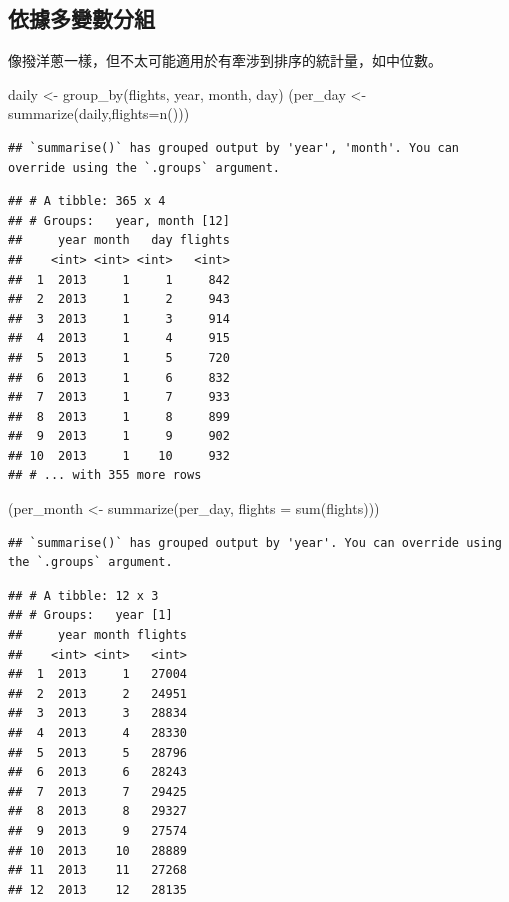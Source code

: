 \documentclass[
]{book}
\newenvironment{Shaded}{\begin{snugshade}}{\end{snugshade}}
\newcommand{\AttributeTok}[1]{\textcolor[rgb]{0.77,0.63,0.00}{#1}}
\newcommand{\FunctionTok}[1]{\textcolor[rgb]{0.00,0.00,0.00}{#1}}
\newcommand{\NormalTok}[1]{#1}
\newcommand{\OtherTok}[1]{\textcolor[rgb]{0.56,0.35,0.01}{#1}}
\theoremstyle{definition}
\theoremstyle{remark}
\begin{document}
\hypertarget{ux4f9dux64daux591aux8b8aux6578ux5206ux7d44}{%
\subsection{依據多變數分組}\label{ux4f9dux64daux591aux8b8aux6578ux5206ux7d44}}

像撥洋蔥一樣，但不太可能適用於有牽涉到排序的統計量，如中位數。

\begin{Shaded}
\begin{Highlighting}[]
\NormalTok{daily }\OtherTok{\textless{}{-}} \FunctionTok{group\_by}\NormalTok{(flights, year, month, day)}
\NormalTok{(per\_day }\OtherTok{\textless{}{-}}\FunctionTok{summarize}\NormalTok{(daily,}\AttributeTok{flights=}\FunctionTok{n}\NormalTok{()))}
\end{Highlighting}
\end{Shaded}

\begin{verbatim}
## `summarise()` has grouped output by 'year', 'month'. You can override using the `.groups` argument.
\end{verbatim}

\begin{verbatim}
## # A tibble: 365 x 4
## # Groups:   year, month [12]
##     year month   day flights
##    <int> <int> <int>   <int>
##  1  2013     1     1     842
##  2  2013     1     2     943
##  3  2013     1     3     914
##  4  2013     1     4     915
##  5  2013     1     5     720
##  6  2013     1     6     832
##  7  2013     1     7     933
##  8  2013     1     8     899
##  9  2013     1     9     902
## 10  2013     1    10     932
## # ... with 355 more rows
\end{verbatim}

\begin{Shaded}
\begin{Highlighting}[]
\NormalTok{(per\_month }\OtherTok{\textless{}{-}} \FunctionTok{summarize}\NormalTok{(per\_day, }\AttributeTok{flights =} \FunctionTok{sum}\NormalTok{(flights)))}
\end{Highlighting}
\end{Shaded}

\begin{verbatim}
## `summarise()` has grouped output by 'year'. You can override using the `.groups` argument.
\end{verbatim}

\begin{verbatim}
## # A tibble: 12 x 3
## # Groups:   year [1]
##     year month flights
##    <int> <int>   <int>
##  1  2013     1   27004
##  2  2013     2   24951
##  3  2013     3   28834
##  4  2013     4   28330
##  5  2013     5   28796
##  6  2013     6   28243
##  7  2013     7   29425
##  8  2013     8   29327
##  9  2013     9   27574
## 10  2013    10   28889
## 11  2013    11   27268
## 12  2013    12   28135
\end{verbatim}
\end{document}
